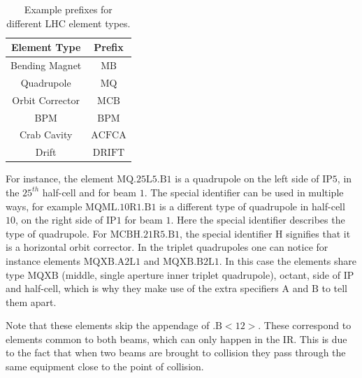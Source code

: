 \begin{table}[!hbt]
    \centering
    \begin{tabular}{|c|c|}
        \toprule
        \textbf{Element Type} & \textbf{Prefix}   \\
        \midrule
            Bending Magnet    & $\mathrm{MB}$       \\
            Quadrupole        & $\mathrm{MQ}$       \\
            Orbit  Corrector  & $\mathrm{MCB}$      \\
            BPM               & $\mathrm{BPM}$      \\
            Crab Cavity       & $\mathrm{ACFCA}$    \\
            Drift             & $\mathrm{DRIFT}$    \\
        \bottomrule
    \end{tabular}
    \caption{Example prefixes for different LHC element types.}
    \label{table:element_prefix_examples}
 \end{table}

For instance, the element $\mathrm{MQ.25L5.B1}$ is a quadrupole on the left side of $\mathrm{IP5}$, in the $25^{th}$ half-cell and for beam $1$.
The special identifier can be used in multiple ways, for example $\mathrm{MQML.10R1.B1}$ is a different type of quadrupole in half-cell $10$, on the right side of $\mathrm{IP1}$ for beam $1$.
Here the special identifier describes the type of quadrupole.
For $\mathrm{MCBH.21R5.B1}$, the special identifier $\mathrm{H}$ signifies that it is a horizontal orbit corrector.
In the triplet quadrupoles one can notice for instance elements $\mathrm{MQXB.A2L1}$ and $\mathrm{MQXB.B2L1}$.
In this case the elements share type $\mathrm{MQXB}$ (middle, single aperture inner triplet quadrupole), octant, side of $\mathrm{IP}$ and half-cell, which is why they make use of the extra specifiers $\mathrm{A}$ and $\mathrm{B}$ to tell them apart.

Note that these elements skip the appendage of $\mathrm{.B<12>}$.
These correspond to elements common to both beams, which can only happen in the $\mathrm{IR}$.
This is due to the fact that when two beams are brought to collision they pass through the same equipment close to the point of collision.

